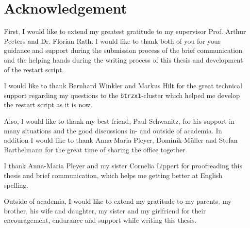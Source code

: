 \NewPage
\chapter*{Acknowledgement}
\label{chap:acknowledgement}

First, I would like to extend my greatest gratitude to my supervisor Prof. Arthur Peeters and Dr. Florian Rath. I would like to thank both of you for your guidance and support during the submission process of the brief communication and the helping hands during the writing process of this thesis and development of the restart script. \bigskip

I would like to thank Bernhard Winkler and Markus Hilt for the great technical support regarding my questions to the \texttt{btrzx1}-cluster which helped me develop the restart script as it is now. \bigskip

Also, I would like to thank my best friend, Paul Schwanitz, for his support in many situations and the good discussions in- and outside of academia. In addition I would like to thank Anna-Maria Pleyer, Dominik Müller and Stefan Barthelmann for the great time of sharing the office together. \bigskip

I thank Anna-Maria Pleyer and my sister Cornelia Lippert for proofreading this thesis and brief communication, which helps me getting better at English spelling. \bigskip

Outside of academia, I would like to extend my gratitude to my parents, my brother, his wife and daughter, my sister and my girlfriend for their encouragement, endurance and support while writing this thesis. 
